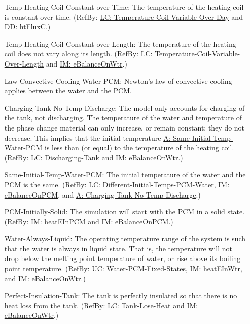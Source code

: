 \documentclass[12pt]{article}
\begin{document}
\begin{itemize}
\item[Temp-Heating-Coil-Constant-over-Time:\phantomsection\label{assumpTHCCoT}]The temperature of the heating coil is constant over time. (RefBy: \hyperref[likeChgTCVOD]{LC: Temperature-Coil-Variable-Over-Day} and \hyperref[DD:htFluxC]{DD: htFluxC}.)
\item[Temp-Heating-Coil-Constant-over-Length:\phantomsection\label{assumpTHCCoL}]The temperature of the heating coil does not vary along its length. (RefBy: \hyperref[likeChgTCVOL]{LC: Temperature-Coil-Variable-Over-Length} and \hyperref[IM:eBalanceOnWtr]{IM: eBalanceOnWtr}.)
\item[Law-Convective-Cooling-Water-PCM:\phantomsection\label{assumpLCCWP}]Newton's law of convective cooling applies between the water and the PCM.
\item[Charging-Tank-No-Temp-Discharge:\phantomsection\label{assumpCTNOD}]The model only accounts for charging of the tank, not discharging. The temperature of the water and temperature of the phase change material can only increase, or remain constant; they do not decrease. This implies that the initial temperature \hyperref[assumpSITWP]{A: Same-Initial-Temp-Water-PCM} is less than (or equal) to the temperature of the heating coil. (RefBy: \hyperref[likeChgDT]{LC: Discharging-Tank} and \hyperref[IM:eBalanceOnWtr]{IM: eBalanceOnWtr}.)
\item[Same-Initial-Temp-Water-PCM:\phantomsection\label{assumpSITWP}]The initial temperature of the water and the PCM is the same. (RefBy: \hyperref[likeChgDITPW]{LC: Different-Initial-Temps-PCM-Water}, \hyperref[IM:eBalanceOnPCM]{IM: eBalanceOnPCM}, and \hyperref[assumpCTNOD]{A: Charging-Tank-No-Temp-Discharge}.)
\item[PCM-Initially-Solid:\phantomsection\label{assumpPIS}]The simulation will start with the PCM in a solid state. (RefBy: \hyperref[IM:heatEInPCM]{IM: heatEInPCM} and \hyperref[IM:eBalanceOnPCM]{IM: eBalanceOnPCM}.)
\item[Water-Always-Liquid:\phantomsection\label{assumpWAL}]The operating temperature range of the system is such that the water is always in liquid state. That is, the temperature will not drop below the melting point temperature of water, or rise above its boiling point temperature. (RefBy: \hyperref[unlikeChgWPFS]{UC: Water-PCM-Fixed-States}, \hyperref[IM:heatEInWtr]{IM: heatEInWtr}, and \hyperref[IM:eBalanceOnWtr]{IM: eBalanceOnWtr}.)
\item[Perfect-Insulation-Tank:\phantomsection\label{assumpPIT}]The tank is perfectly insulated so that there is no heat loss from the tank. (RefBy: \hyperref[likeChgTLH]{LC: Tank-Lose-Heat} and \hyperref[IM:eBalanceOnWtr]{IM: eBalanceOnWtr}.)

\end{itemize}
\end{document}
